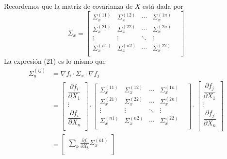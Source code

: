 \documentclass[a4paper, 10pt]{article}
\begin{document}
Recordemos que la matriz de covarianza de $X$ está dada por
\begin{equation}
    \Sigma_x = \begin{bmatrix}
        \Sigma_x^{(11)} & \Sigma_x^{(12)} & \cdots & \Sigma_x^{(1n)}   \\
        \Sigma_x^{(21)} & \Sigma_x^{(22)} & \cdots & \Sigma_x^{(2n)}   \\
        \vdots          & \vdots          & \ddots & \vdots            \\
        \Sigma_x^{(n1)} & \Sigma_x^{(n2)} & \cdots & \Sigma_x^{(22)} & \\
    \end{bmatrix}
\end{equation}
La expresión (21) es lo mismo que
\begin{equation}
    \begin{split}
        \Sigma_y^{(ij)} &= \nabla f_i \cdot \Sigma_x \cdot \nabla f_j \\[1em]
        &=\begin{bmatrix}
            \dfrac{\partial f_i}{\partial X_1} \\
            \vdots                             \\
            \dfrac{\partial f_i}{\partial X_n} \\
        \end{bmatrix}
        \cdot
        \begin{bmatrix}
            \Sigma_x^{(11)} & \Sigma_x^{(12)} & \cdots & \Sigma_x^{(1n)}   \\
            \Sigma_x^{(21)} & \Sigma_x^{(22)} & \cdots & \Sigma_x^{(2n)}   \\
            \vdots          & \vdots          & \ddots & \vdots            \\
            \Sigma_x^{(n1)} & \Sigma_x^{(n2)} & \cdots & \Sigma_x^{(22)} & \\
        \end{bmatrix}
        \cdot
        \begin{bmatrix}
            \dfrac{\partial f_j}{\partial X_1} \\
            \vdots                             \\
            \dfrac{\partial f_j}{\partial X_n} \\
        \end{bmatrix}
        \\[1em]
        &=\begin{bmatrix}
            \sum_{k} {\frac{\partial f_i}{\partial X_k}\Sigma_x^{(k1)}} \\

\end{bmatrix}
\end{split}
\end{equation}
\end{document}
